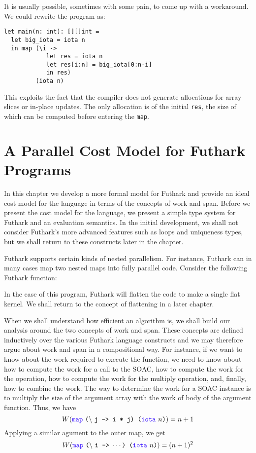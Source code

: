 \documentclass[oneside,11pt]{book}
\newenvironment{wrap}{\vspace{\topskip}\par\noindent\begin{minipage}{\linewidth}}{\end{minipage}\par}
\begin{document}
It is usually possible, sometimes with some pain, to come up with a
workaround.  We could rewrite the program as:

\begin{lstlisting}
let main(n: int): [][]int =
  let big_iota = iota n
  in map (\i ->
            let res = iota n
            let res[i:n] = big_iota[0:n-i]
            in res)
         (iota n)
\end{lstlisting}

This exploits the fact that the compiler does not generate allocations
for array slices or in-place updates.  The only allocation is of the
initial \texttt{res}, the size of which can be computed before
entering the \texttt{map}.

\chapter{A Parallel Cost Model for Futhark Programs}
\label{chap:costmodel}
In this chapter we develop a more formal model for Futhark and provide
an ideal cost model for the language in terms of the concepts of work
and span. Before we present the cost model for the language, we
present a simple type system for Futhark and an evaluation
semantics. In the initial development, we shall not consider Futhark's
more advanced features such as loops and uniqueness types, but we
shall return to these constructs later in the chapter.

Futhark supports certain kinds of nested parallelism. For instance,
Futhark can in many cases map two nested maps into fully parallel
code. Consider the following Futhark function:

\begin{wrap}

\end{wrap}

\noindent
In the case of this program, Futhark will flatten the code to make a
single flat kernel. We shall return to the concept of flattening in a
later chapter.

When we shall understand how efficient an algorithm is, we shall build
our analysis around the two concepts of work and span. These concepts
are defined inductively over the various Futhark language constructs
and we may therefore argue about work and span in a compositional
way. For instance, if we want to know about the work required to
execute the  function, we need to know about how to
compute the work for a call to the  SOAC, how to compute the
work for the  operation, how to compute the work for the
multiply operation, and, finally, how to combine the work. The way to
determine the work for a  SOAC instance is to multiply the
size of the argument array with the work of body of the argument
function. Thus, we have
$$ W(\fop{map}~\kw{(}\backslash~\kw{j -> i * j) (}\fop{iota}~\kw{$n$)}) = n+1 $$
Applying a similar agument to the outer map, we get
$$W(\fop{map}~\kw{(}\backslash~\kw{i -> $\cdots$) (}\fop{iota}~\kw{$n$)}) = (n+1)^2 $$
\end{document}
